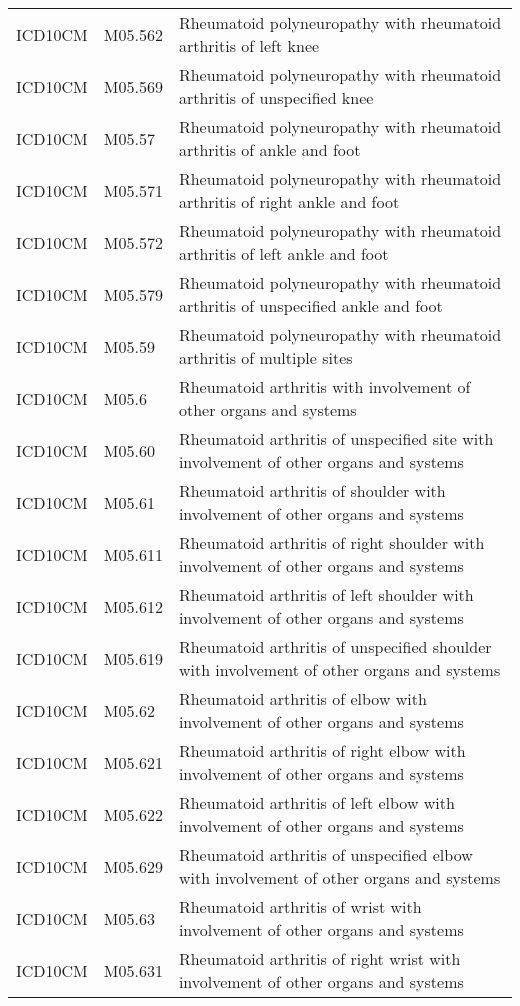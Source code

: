 \begin{table}[ht]
\begin{tabular}{lll}
  ICD10CM & M05.562 & Rheumatoid polyneuropathy with rheumatoid arthritis of left knee \\ 
  ICD10CM & M05.569 & Rheumatoid polyneuropathy with rheumatoid arthritis of unspecified knee \\ 
  ICD10CM & M05.57 & Rheumatoid polyneuropathy with rheumatoid arthritis of ankle and foot \\ 
  ICD10CM & M05.571 & Rheumatoid polyneuropathy with rheumatoid arthritis of right ankle and foot \\ 
  ICD10CM & M05.572 & Rheumatoid polyneuropathy with rheumatoid arthritis of left ankle and foot \\ 
  ICD10CM & M05.579 & Rheumatoid polyneuropathy with rheumatoid arthritis of unspecified ankle and foot \\ 
  ICD10CM & M05.59 & Rheumatoid polyneuropathy with rheumatoid arthritis of multiple sites \\ 
  ICD10CM & M05.6 & Rheumatoid arthritis with involvement of other organs and systems \\ 
  ICD10CM & M05.60 & Rheumatoid arthritis of unspecified site with involvement of other organs and systems \\ 
  ICD10CM & M05.61 & Rheumatoid arthritis of shoulder with involvement of other organs and systems \\ 
  ICD10CM & M05.611 & Rheumatoid arthritis of right shoulder with involvement of other organs and systems \\ 
  ICD10CM & M05.612 & Rheumatoid arthritis of left shoulder with involvement of other organs and systems \\ 
  ICD10CM & M05.619 & Rheumatoid arthritis of unspecified shoulder with involvement of other organs and systems \\ 
  ICD10CM & M05.62 & Rheumatoid arthritis of elbow with involvement of other organs and systems \\ 
  ICD10CM & M05.621 & Rheumatoid arthritis of right elbow with involvement of other organs and systems \\ 
  ICD10CM & M05.622 & Rheumatoid arthritis of left elbow with involvement of other organs and systems \\ 
  ICD10CM & M05.629 & Rheumatoid arthritis of unspecified elbow with involvement of other organs and systems \\ 
  ICD10CM & M05.63 & Rheumatoid arthritis of wrist with involvement of other organs and systems \\ 
  ICD10CM & M05.631 & Rheumatoid arthritis of right wrist with involvement of other organs and systems \\ 

\end{tabular}
\end{table}
